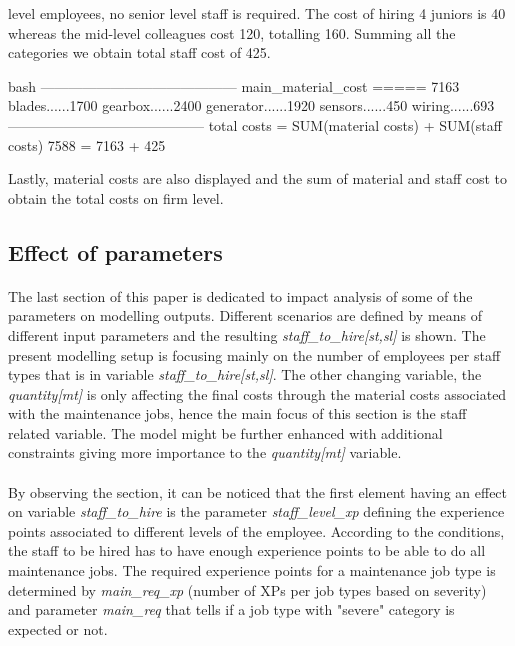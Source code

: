         level employees, no senior level staff is required. The cost of hiring 4 juniors is 
        40 whereas the mid-level colleagues cost 120, totalling 160. Summing all the categories
        we obtain total staff cost of 425.
        \bigskip
        \newline
        \vspace{2pt}
        \begin{boxminted}{bash}
            ------------------------------------------
            main_material_cost ===== 7163
            blades......1700
            gearbox......2400
            generator......1920
            sensors......450
            wiring......693
            ------------------------------------------
            total costs = SUM(material costs) + SUM(staff costs) 
            7588 = 7163 + 425
        \end{boxminted}
        \newline
        Lastly, material costs are also displayed and the sum of material and staff cost to obtain
        the total costs on firm level.

    \subsection{Effect of parameters}
    \paragraph{} The last section of this paper is dedicated to impact analysis of some of the
    parameters on modelling outputs. Different scenarios are defined by means of different input 
    parameters and the resulting \textit{staff\_to\_hire[st,sl]} is shown.
    The present modelling setup is focusing mainly on the number of employees per staff types that is 
    in variable \textit{staff\_to\_hire[st,sl]}. The other changing variable, 
    the \textit{quantity[mt]} is only affecting the final costs through the material costs associated 
    with the maintenance jobs, hence the main focus of this section is the staff related variable. 
    The model might be further enhanced with additional constraints giving more importance 
    to the \textit{quantity[mt]} variable.

    \paragraph{} By observing the  section, it can be noticed that the first 
    element having an effect on variable \textit{staff\_to\_hire} is the parameter 
    \textit{staff\_level\_xp} defining the experience points associated to different levels of the 
    employee. According to the conditions, the staff to be hired has to have enough experience points 
    to be able to do all maintenance jobs. The required experience points for a maintenance job type 
    is determined by \textit{main\_req\_xp} (number of XPs per job types based on severity) and 
    parameter \textit{main\_req} that tells if a job type with "severe" category is expected or not.
    
